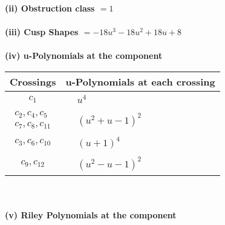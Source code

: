 \documentclass[1p]{elsarticle_modified}
\theoremstyle{definition}
\begin{document}
\flushleft \textbf{(ii) Obstruction class $= 1$}\\~\\
\flushleft \textbf{(iii) Cusp Shapes $= -18 u^3-18 u^2+18 u+8$}\\~\\
\newpage\renewcommand{\arraystretch}{1}
\flushleft \textbf{(iv) u-Polynomials at the component}\newline \\
\begin{tabular}{m{50pt}|m{274pt}}
Crossings & \hspace{64pt}u-Polynomials at each crossing \\
\hline $$\begin{aligned}c_{1}\end{aligned}$$&$\begin{aligned}
&u^4
\end{aligned}$\\
\hline $$\begin{aligned}c_{2},c_{4},c_{5}\\c_{7},c_{8},c_{11}\end{aligned}$$&$\begin{aligned}
&(u^2+u-1)^2
\end{aligned}$\\
\hline $$\begin{aligned}c_{3},c_{6},c_{10}\end{aligned}$$&$\begin{aligned}
&(u+1)^4
\end{aligned}$\\
\hline $$\begin{aligned}c_{9},c_{12}\end{aligned}$$&$\begin{aligned}
&(u^2- u-1)^2
\end{aligned}$\\
\hline
\end{tabular}\\~\\
\newpage\renewcommand{\arraystretch}{1}
\flushleft \textbf{(v) Riley Polynomials at the component}\newline \\
\end{document}
